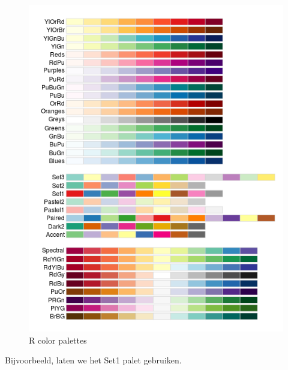 \documentclass[]{tufte-book}
\begin{document}
\begin{figure}
\centering
\includegraphics{images/brewer-pal.png}
\caption{R color palettes}
\end{figure}

Bijvoorbeeld, laten we het Set1 palet gebruiken.
\end{document}
